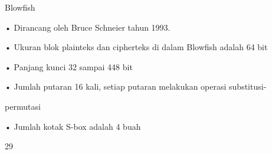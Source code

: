 \documentclass{article}
\begin{document}

Blowfish

• Dirancang oleh Bruce Schneier tahun 1993.

• Ukuran blok plainteks dan cipherteks di dalam Blowfish adalah 64 bit

• Panjang kunci 32 sampai 448 bit

• Jumlah putaran 16 kali, setiap putaran melakukan operasi substitusi-

permutasi

• Jumlah kotak S-box adalah 4 buah

29
\end{document}
